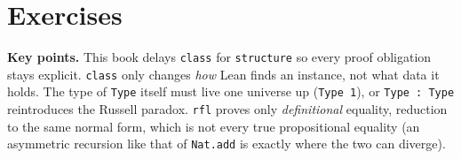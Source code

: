 \section{Exercises}\label{sec:06-rigor-check:05-exercises:1}

\textbf{Key points.} This book delays \texttt{class} for \texttt{structure} so every proof obligation stays explicit. \texttt{class} only changes \emph{how} Lean finds an instance, not what data it holds. The type of \texttt{Type} itself must live one universe up (\texttt{Type 1}), or \texttt{Type : Type} reintroduces the Russell paradox. \texttt{rfl} proves only \emph{definitional} equality, reduction to the same normal form, which is not every true propositional equality (an asymmetric recursion like that of \texttt{Nat.add} is exactly where the two can diverge).

